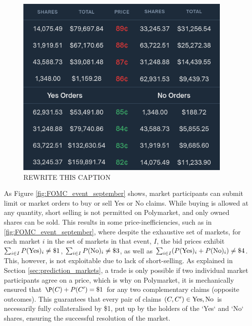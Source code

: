 \begin{figure}[H]
  \begin{center}
    \includegraphics[width=0.95\textwidth]{figures/polymarket_orderbook.png}
  \end{center}
  \caption{REWRITE THIS CAPTION}
  \label{fig:polymarket_orderbook}
\end{figure}

As Figure \ref{fig:FOMC_event_september} shows, market participants can submit limit or market orders to buy or sell Yes or No claims.
While buying is allowed at any quantity, short selling is not permitted on Polymarket, and only owned shares can be sold.
This results in some price-inefficiencies, such as in \ref{fig:FOMC_event_september}, where despite the exhaustive set of markets, for each market $i$ in the set of markets in that event, $I$, the bid prices exhibit $\sum_{i \in I} P(\text{Yes})_{i} \ne \$1$, $\sum_{i \in I} P(\text{No})_{i} \ne \$3$, as well as $\sum_{i \in I} (P(\text{Yes})_{i} + P(\text{No})_{i}) \ne \$4$. This, however, is not exploitable due to lack of short-selling.
As explained in Section \ref{sec:prediction_markets}, a trade is only possible if two individual market participants agree on a price, which is why on Polymarket, it is mechanically ensured that $\P(C) + P(C') = \$1$ for any two complementary claims (opposite outcomes).
This guarantees that every pair of claims $(C, C') \in {\text{Yes}, \text{No}}$ is necessarily fully collateralised by \$1, put up by the holders of the `Yes` and `No` shares, ensuring the successful resolution of the market. \parencite{PMDocs}

